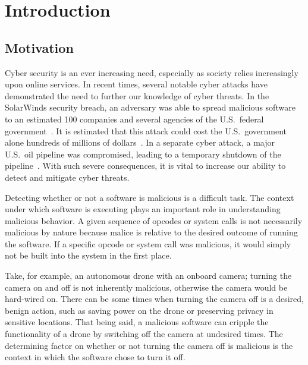 \documentclass[../stegner_thesis.tex]{subfiles}
\begin{document}
\chapter{Introduction}%
\label{ch:intro}

\section{Motivation}%
\label{sec:intro_motivation}

\par Cyber security is an ever increasing need, especially as society relies
increasingly upon online services.
In recent times, several notable cyber attacks have demonstrated the need to
further our knowledge of cyber threats.
In the SolarWinds security breach, an adversary was able to spread malicious
software to an estimated 100 companies and several agencies of the U.S.\
federal government~\cite{temple-rastonWorstNightmare}.
It is estimated that this attack could cost the U.S.\ government alone hundreds
of millions of dollars~\cite{nolanEconomicCosts}.
In a separate cyber attack, a major U.S.\ oil pipeline was compromised, leading
to a temporary shutdown of the pipeline~\cite{penalozaCybersecurityAttack2021}.
With such severe consequences, it is vital to increase our ability to detect
and mitigate cyber threats.

\par Detecting whether or not a software is malicious is a difficult task.
The context under which software is executing plays an important role in
understanding malicious behavior.
A given sequence of opcodes or system calls is not necessarily malicious by
nature because malice is relative to the desired outcome of running the
software.
If a specific opcode or system call was malicious, it would simply not be built
into the system in the first place.

\par Take, for example, an autonomous drone with an onboard camera; turning the
camera on and off is not inherently malicious, otherwise the camera would be
hard-wired on.
There can be some times when turning the camera off is a desired, benign
action, such as saving power on the drone or preserving privacy in sensitive
locations.
That being said, a malicious software can cripple the functionality of a drone
by switching off the camera at undesired times.
The determining factor on whether or not turning the camera off is malicious is
the context in which the software chose to turn it off.
\end{document}
